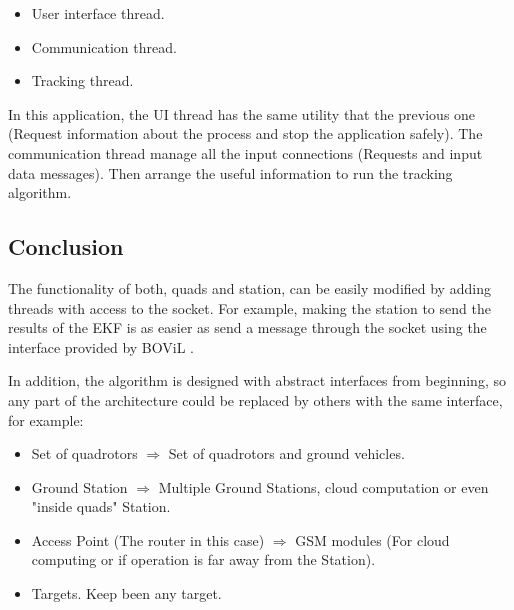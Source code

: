 	\begin{itemize}
		\item User interface thread.
		\item Communication thread.
		\item Tracking thread.
	\end{itemize}

	In this application, the UI thread has the same utility that the previous one (Request information about the process and stop the application safely). The communication thread manage all the input connections (Requests and input data messages). Then arrange the useful information to run the tracking algorithm.
	
\subsection{Conclusion}
The functionality of both, quads and station, can be easily modified by adding threads with access to the socket. For example, making the station to send the results of the EKF is as easier as send a message through the socket using the interface provided by BOViL \cite{BOViL}. 

In addition, the algorithm is designed with abstract interfaces from beginning, so any part of the architecture could be replaced by others with the same interface, for example:

\begin{itemize}
  \item Set of quadrotors $\Longrightarrow$ Set of quadrotors and ground vehicles.
  \item Ground Station $\Longrightarrow$ Multiple Ground Stations, cloud computation \cite{Cloud_computing} or even "inside quads" Station.
  \item Access Point (The router in this case) $\Longrightarrow$ GSM modules (For cloud computing or if operation is far away from the Station).
  \item Targets. Keep been any target.
\end{itemize}


